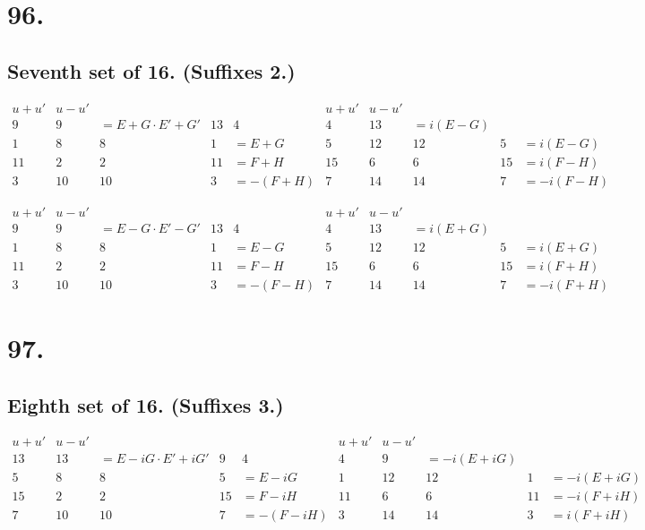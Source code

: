 \documentclass[11pt,a4paper]{book}
\begin{document}
\newpage
\section*{96.}
\label{sec:96}

\subsection*{Seventh set of 16. (Suffixes 2.)}

\[
\begin{array}{c|cccc|c|cccc}
u+u' & u-u' & & & & u+u' & u-u' & & & \\
\hline
9 & 9 & = E+G \cdot E'+G' & 13 & 4 & 4 & 13 & = i(E-G) \\
1 & 8 & 8 & 1 & = E+G & 5 & 12 & 12 & 5 & = i(E-G) \\
11 & 2 & 2 & 11 & = F+H & 15 & 6 & 6 & 15 & = i(F-H) \\
3 & 10 & 10 & 3 & = -(F+H) & 7 & 14 & 14 & 7 & = -i(F-H)
\end{array}
\]

\[
\begin{array}{c|cccc|c|cccc}
u+u' & u-u' & & & & u+u' & u-u' & & & \\
\hline
9 & 9 & = E-G \cdot E'-G' & 13 & 4 & 4 & 13 & = i(E+G) \\
1 & 8 & 8 & 1 & = E-G & 5 & 12 & 12 & 5 & = i(E+G) \\
11 & 2 & 2 & 11 & = F-H & 15 & 6 & 6 & 15 & = i(F+H) \\
3 & 10 & 10 & 3 & = -(F-H) & 7 & 14 & 14 & 7 & = -i(F+H)
\end{array}
\]

\newpage
\section*{97.}
\label{sec:97}

\subsection*{Eighth set of 16. (Suffixes 3.)}

\[
\begin{array}{c|cccc|c|cccc}
u+u' & u-u' & & & & u+u' & u-u' & & & \\
\hline
13 & 13 & = E-iG \cdot E'+iG' & 9 & 4 & 4 & 9 & = -i(E+iG) \\
5 & 8 & 8 & 5 & = E-iG & 1 & 12 & 12 & 1 & = -i(E+iG) \\
15 & 2 & 2 & 15 & = F-iH & 11 & 6 & 6 & 11 & = -i(F+iH) \\
7 & 10 & 10 & 7 & = -(F-iH) & 3 & 14 & 14 & 3 & = i(F+iH)
\end{array}
\]
\end{document}
